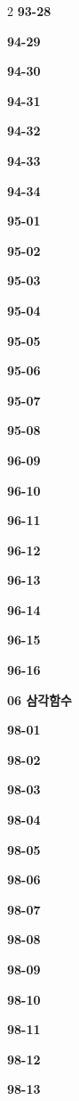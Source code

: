 \documentclass[10pt,a4paper]{article}
\begin{document}
\begin{multicols}{2}
\noindent\textbf{93-28}\ \par
\noindent\textbf{94-29}\ \par
\noindent\textbf{94-30}\ \par
\noindent\textbf{94-31}\ \par
\noindent\textbf{94-32}\ \par
\noindent\textbf{94-33}\ \par
\noindent\textbf{94-34}\ \par
\noindent\textbf{95-01}\ \par
\noindent\textbf{95-02}\ \par
\noindent\textbf{95-03}\ \par
\noindent\textbf{95-04}\ \par
\noindent\textbf{95-05}\ \par
\noindent\textbf{95-06}\ \par
\noindent\textbf{95-07}\ \par
\noindent\textbf{95-08}\ \par
\noindent\textbf{96-09}\ \par
\noindent\textbf{96-10}\ \par
\noindent\textbf{96-11}\ \par
\noindent\textbf{96-12}\ \par
\noindent\textbf{96-13}\ \par
\noindent\textbf{96-14}\ \par
\noindent\textbf{96-15}\ \par
\noindent\textbf{96-16}\ \par
\noindent\textbf{06 삼각함수}\par\smallskip
\noindent\textbf{98-01}\ \par
\noindent\textbf{98-02}\ \par
\noindent\textbf{98-03}\ \par
\noindent\textbf{98-04}\ \par
\noindent\textbf{98-05}\ \par
\noindent\textbf{98-06}\ \par
\noindent\textbf{98-07}\ \par
\noindent\textbf{98-08}\ \par
\noindent\textbf{98-09}\ \par
\noindent\textbf{98-10}\ \par
\noindent\textbf{98-11}\ \par
\noindent\textbf{98-12}\ \par
\noindent\textbf{98-13}\ \par

\end{multicols}
\end{document}
